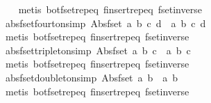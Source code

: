 \begin{isabellebody}
%
\isadelimproof
\ \ %
\endisadelimproof
%
\isatagproof
{}\isamarkupfalse%
\ {\isacharparenleft}metis\ bot{\isacharunderscore}fset{\isachardot}rep{\isacharunderscore}eq\ finsert{\isachardot}rep{\isacharunderscore}eq\ fset{\isacharunderscore}inverse{\isacharparenright}%
\endisatagproof
{\isafoldproof}%
%
\isadelimproof
\isanewline
%
\endisadelimproof
\isanewline
{}\isamarkupfalse%
\ abs{\isacharunderscore}fset{\isacharunderscore}fourton{\isacharbrackleft}simp{\isacharbrackright}{\isacharcolon}\ {\isachardoublequoteopen}Abs{\isacharunderscore}fset\ {\isacharbraceleft}a{\isacharcomma}\ b{\isacharcomma}\ c{\isacharcomma}\ d{\isacharbraceright}\ {\isacharequal}\ {\isacharbraceleft}{\isacharbar}a{\isacharcomma}\ b{\isacharcomma}\ c{\isacharcomma}\ d{\isacharbar}{\isacharbraceright}{\isachardoublequoteclose}\isanewline
%
\isadelimproof
\ \ %
\endisadelimproof
%
\isatagproof
{}\isamarkupfalse%
\ {\isacharparenleft}metis\ bot{\isacharunderscore}fset{\isachardot}rep{\isacharunderscore}eq\ finsert{\isachardot}rep{\isacharunderscore}eq\ fset{\isacharunderscore}inverse{\isacharparenright}%
\endisatagproof
{\isafoldproof}%
%
\isadelimproof
\isanewline
%
\endisadelimproof
\isanewline
{}\isamarkupfalse%
\ abs{\isacharunderscore}fset{\isacharunderscore}tripleton{\isacharbrackleft}simp{\isacharbrackright}{\isacharcolon}\ {\isachardoublequoteopen}Abs{\isacharunderscore}fset\ {\isacharbraceleft}a{\isacharcomma}\ b{\isacharcomma}\ c{\isacharbraceright}\ {\isacharequal}\ {\isacharbraceleft}{\isacharbar}a{\isacharcomma}\ b{\isacharcomma}\ c{\isacharbar}{\isacharbraceright}{\isachardoublequoteclose}\isanewline
%
\isadelimproof
\ \ %
\endisadelimproof
%
\isatagproof
{}\isamarkupfalse%
\ {\isacharparenleft}metis\ bot{\isacharunderscore}fset{\isachardot}rep{\isacharunderscore}eq\ finsert{\isachardot}rep{\isacharunderscore}eq\ fset{\isacharunderscore}inverse{\isacharparenright}%
\endisatagproof
{\isafoldproof}%
%
\isadelimproof
\isanewline
%
\endisadelimproof
\isanewline
{}\isamarkupfalse%
\ abs{\isacharunderscore}fset{\isacharunderscore}doubleton{\isacharbrackleft}simp{\isacharbrackright}{\isacharcolon}\ {\isachardoublequoteopen}Abs{\isacharunderscore}fset\ {\isacharbraceleft}a{\isacharcomma}\ b{\isacharbraceright}\ {\isacharequal}\ {\isacharbraceleft}{\isacharbar}a{\isacharcomma}\ b{\isacharbar}{\isacharbraceright}{\isachardoublequoteclose}\isanewline
%
\isadelimproof
\ \ %
\endisadelimproof
%
\isatagproof
{}\isamarkupfalse%
\ {\isacharparenleft}metis\ bot{\isacharunderscore}fset{\isachardot}rep{\isacharunderscore}eq\ finsert{\isachardot}rep{\isacharunderscore}eq\ fset{\isacharunderscore}inverse{\isacharparenright}%

\end{isabellebody}
